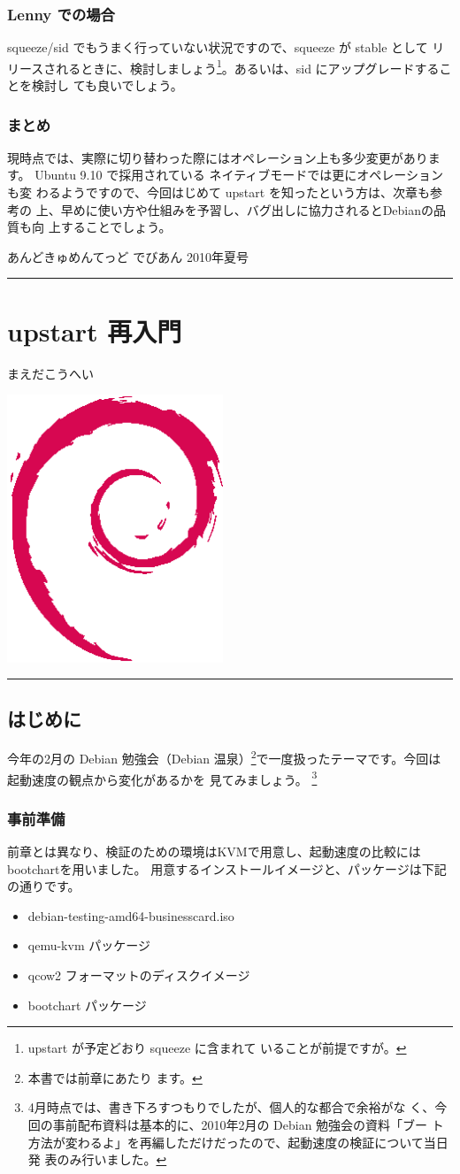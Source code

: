 \documentclass[mingoth,a4paper]{jsarticle}
\renewcommand{\dancersection}[2]{%
\newpage
あんどきゅめんてっど でびあん 2010年夏号
%
\vspace{0.1mm}\\
{\color{dancerlightblue}\rule{\hsize}{2mm}}

%
%
\begin{minipage}[t]{0.6\hsize}
\color{dancerdarkblue}
\vspace{1cm}
\section{#1}
\hfill{}#2\\
\end{minipage}
\begin{minipage}[t]{0.4\hsize}
\vspace{-2cm}
\hfill{}\includegraphics[height=8cm]{image200502/openlogo-nd.eps}\\
\vspace{-5cm}
\end{minipage}
%
%
{\color{dancerdarkblue}\rule{0.74\hsize}{2mm}}
%
\vspace{2cm}
}
\begin{document}
\subsubsection{Lenny での場合}

squeeze/sid でもうまく行っていない状況ですので、squeeze が stable として
リリースされるときに、検討しましょう\footnote{upstart が予定どおり squeeze に含まれて
いることが前提ですが。}。あるいは、sid にアップグレードすることを検討し
ても良いでしょう。

\subsubsection{まとめ}

現時点では、実際に切り替わった際にはオペレーション上も多少変更があります。
Ubuntu 9.10 で採用されている ネイティブモードでは更にオペレーションも変
わるようですので、今回はじめて upstart を知ったという方は、次章も参考の
上、早めに使い方や仕組みを予習し、バグ出しに協力されるとDebianの品質も向
上することでしょう。


\dancersection{upstart 再入門}{まえだこうへい}

\subsection{はじめに}
\label{ch:re-startup-upstart}
今年の2月の Debian 勉強会（Debian 温泉）\footnote{本書では前章にあたり
ます。}で一度扱ったテーマです。今回は起動速度の観点から変化があるかを
見てみましょう。
\footnote{4月時点では、書き下ろすつもりでしたが、個人的な都合で余裕がな
く、今回の事前配布資料は基本的に、2010年2月の Debian 勉強会の資料「ブー
ト方法が変わるよ」を再編しただけだったので、起動速度の検証について当日発
表のみ行いました。}

\subsubsection{事前準備}
前章とは異なり、検証のための環境はKVMで用意し、起動速度の比較には
bootchartを用いました。
用意するインストールイメージと、パッケージは下記の通りです。

 \begin{itemize}
  \item debian-testing-amd64-businesscard.iso
  \item qemu-kvm パッケージ
  \item qcow2 フォーマットのディスクイメージ
  \item bootchart パッケージ
 \end{itemize}
\end{document}

